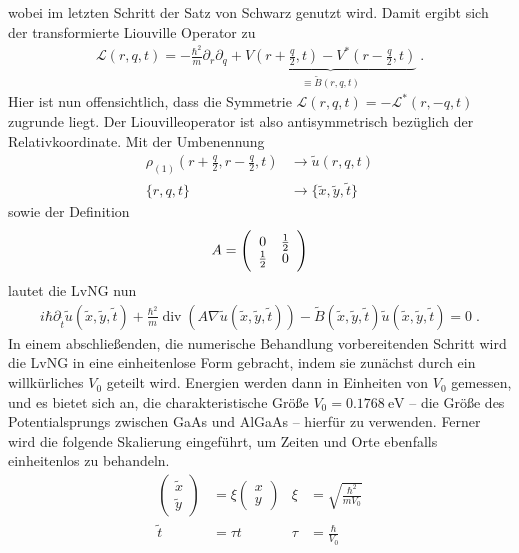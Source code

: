 wobei im letzten Schritt der Satz von Schwarz genutzt wird. Damit ergibt sich der transformierte Liouville Operator zu
\begin{align*}
  \mathcal{L}(r,q,t) = -\frac{\hbar^2}{m} \partial_r\partial_q + \underbrace{V\left(r+\frac{q}{2},t\right) - V^*\left(r-\frac{q}{2},t\right)}_{\equiv \tilde{B}(r,q,t)} \; .
\end{align*}
Hier ist nun offensichtlich, dass die Symmetrie $\mathcal{L}(r,q,t)=-\mathcal{L}^*(r,-q,t)$ zugrunde liegt. Der Liouvilleoperator ist also antisymmetrisch bezüglich der Relativkoordinate. Mit der Umbenennung
\begin{align*}
  \rho_{(1)}\left(r+\frac{q}{2}, r-\frac{q}{2}, t\right) &\longrightarrow \tilde{u}(r,q,t) \\
  \{ r, q, t\} &\longrightarrow \{\tilde{x}, \tilde{y}, \tilde{t}\}
\end{align*}
sowie der Definition
\begin{align*}
  A = \left(\begin{array}{c c} 0 & \frac{1}{2} \\ \frac{1}{2} & 0 \end{array} \right)
\end{align*}
lautet die LvNG nun
\begin{align*}
  i\hbar\partial_{\tilde{t}} \tilde{u}(\tilde{x},\tilde{y},\tilde{t})+\frac{\hbar^2}{m}\operatorname{div}(A\nabla \tilde{u}(\tilde{x},\tilde{y},\tilde{t})) -  \tilde{B}(\tilde{x},\tilde{y},\tilde{t}) \tilde{u}(\tilde{x},\tilde{y},\tilde{t}) = 0 \; .
\end{align*}
In einem abschließenden, die numerische Behandlung vorbereitenden Schritt wird die LvNG in eine einheitenlose Form gebracht, indem sie zunächst durch ein willkürliches $V_0$ geteilt wird. Energien werden dann in Einheiten von $V_0$ gemessen, und es bietet sich an, die charakteristische Größe $V_0 = \SI{0.1768}{\electronvolt}$ -- die Größe des Potentialsprungs zwischen GaAs und AlGaAs  -- hierfür zu verwenden.
Ferner wird die folgende Skalierung eingeführt, um Zeiten und Orte ebenfalls einheitenlos zu behandeln.
\begin{align*}
  \left(\begin{array}{c}\tilde{x}\\\tilde{y}\end{array}\right) &= \xi \left(\begin{array}{c}x\\y\end{array}\right)   & \xi &= \sqrt{\frac{\hbar^2}{mV_0}} \\
  \tilde{t} &= \tau t   & \tau &= \frac{\hbar}{V_0}
\end{align*}
